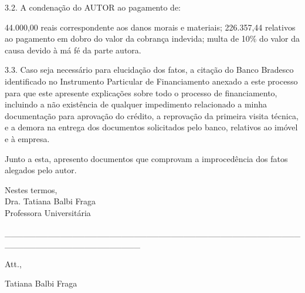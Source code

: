 \documentclass[11pt]{letter}
\begin{document}
3.2. A condenação do AUTOR ao pagamento de:

	44.000,00 reais correspondente aos danos morais e materiais;
	226.357,44 relativos ao pagamento em dobro do valor da cobrança indevida;
	multa de 10\% do valor da causa devido à má fé da parte autora.
	
3.3. Caso seja necessário para elucidação dos fatos, a citação do Banco Bradesco identificado no Instrumento Particular de Financiamento anexado a este processo para que este apresente explicações sobre todo o processo de financiamento, incluindo a não existência de qualquer impedimento relacionado a minha documentação para aprovação do crédito, a reprovação da primeira visita técnica, e a demora na entrega dos documentos solicitados pelo banco, relativos ao imóvel e à empresa. 

	
Junto a esta, apresento documentos que comprovam a improcedência dos fatos alegados pelo autor.

Nestes termos, \\
Dra. Tatiana Balbi Fraga \\
Professora Universitária

\begin{center}
             \_\_\_\_\_\_\_\_\_\_\_\_\_\_\_\_\_\_\_\_\_\_\_\_\_\_\_\_\_\_\_\_\_\_\_\_\_\_\_\_\_\_\_\_\_\_\_\_\_\_\_\_\_\_\_\_\_\_\_\_\_\_\_\_\_\_\_\_\_\_
    
\end{center}  
          
Att.,

Tatiana Balbi Fraga
\end{document}

